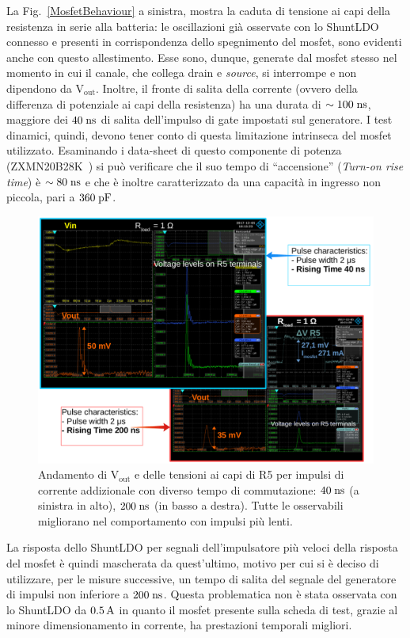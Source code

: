 La Fig.~\ref{MosfetBehaviour} a sinistra, mostra la caduta di tensione ai capi della resistenza in serie alla batteria: le oscillazioni già osservate con lo ShuntLDO connesso e presenti in corrispondenza dello spegnimento del mosfet, sono evidenti anche con questo allestimento.
Esse sono, dunque, generate dal mosfet stesso nel momento in cui il canale, che collega drain e \textit{source}, si interrompe e non dipendono da $\mathrm{V_{out}}$.
Inoltre, il fronte di salita della corrente (ovvero della differenza di potenziale ai capi della resistenza) ha una durata di $\sim 100 \rm \; ns$, maggiore dei $40\rm \; ns$ di salita dell'impulso di gate impostati sul generatore. I test dinamici, quindi, devono tener conto di questa limitazione intrinseca del mosfet utilizzato. Esaminando i data-sheet di questo componente di potenza (ZXMN20B28K~\cite{MOSFET}) si può verificare che il suo tempo di ``accensione'' (\textit{Turn-on rise time}) è $\sim 80 \rm \; ns$ e che \`e inoltre caratterizzato da una capacità in ingresso non piccola, pari a $360\rm \; pF$.
\begin{figure}
\centering
\includegraphics[width=\linewidth]{Immagini/RiseTime}
\caption{Andamento di $\mathrm{V_{out}}$ e delle tensioni ai capi di R5 per impulsi di corrente addizionale con diverso tempo di commutazione: $40\rm \; ns$ (a sinistra in alto), $200\rm \; ns$ (in basso a destra). Tutte le osservabili migliorano nel comportamento con impulsi pi\`u lenti.}
\label{RiseTime}
\end{figure}

La risposta dello ShuntLDO per segnali dell'impulsatore più veloci della risposta del mosfet è quindi mascherata da quest'ultimo, motivo per cui si è deciso di utilizzare, per le misure successive, un tempo di salita del segnale del generatore di impulsi non inferiore a $200\rm \; ns$. Questa problematica non \`e stata osservata con lo ShuntLDO da $0.5\rm \, A$ in quanto il mosfet presente sulla scheda di test, grazie al minore dimensionamento in corrente, ha prestazioni temporali migliori.

